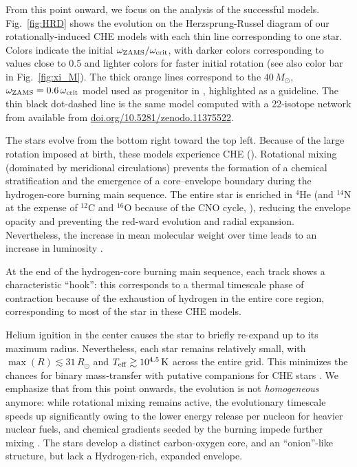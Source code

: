 \documentclass[%
trackchanges,twocolumn]{aastex701}
\DeclareRobustCommand{\Figref}[1]{Fig.~\ref{#1}}
\begin{document}
From this point onward, we focus on the analysis of the successful
models. \Figref{fig:HRD} shows the evolution on the Herzsprung-Russel
diagram of our rotationally-induced CHE models with each thin line
corresponding to one star. Colors indicate the initial
$\omega_{\rm ZAMS}/\omega_{\rm crit}$, with darker colors
corresponding to values close to 0.5 and lighter colors for faster
initial rotation (see also color bar in \Figref{fig:xi_M}). The thick
orange lines correspond to the $40\,M_{\odot}$,
$\omega_{\rm ZAMS}=0.6\,\omega_{\rm crit}$ model used as progenitor in
\cite{gottlieb:24}, highlighted as a guideline. The thin black
dot-dashed line is the same model computed with a 22-isotope network
from \cite{renzo:24} available from
\href{https://doi.org/10.5281/zenodo.11375522}{doi.org/10.5281/zenodo.11375522}.

The stars evolve from the bottom right toward the top left. Because of
the large rotation imposed at birth, these models experience CHE
(\citealt{maeder:00, yoon:06, demink:09}). Rotational mixing
(dominated by meridional circulations) prevents the formation of a
chemical stratification and the emergence of a core--envelope boundary
during the hydrogen-core burning main sequence. The entire star is
enriched in $^{4}\mathrm{He}$ (and $^{14}\mathrm{N}$ at the expense of
$^{12}\mathrm{C}$ and $^{16}\mathrm{O}$ because of the CNO cycle,
\citealt{bethe:39}), reducing the envelope opacity and preventing the
red-ward evolution and radial expansion. Nevertheless, the increase in
mean molecular weight over time leads to an increase in luminosity
\citep[e.g.,][]{kippenhahn:13, xin:2022}.

At the end of the hydrogen-core burning main sequence, each track
shows a characteristic ``hook'': this corresponds to a thermal
timescale phase of contraction because of the exhaustion of hydrogen
in the entire core region, corresponding to most of the star in these
CHE models.

Helium ignition in the center causes the star to briefly re-expand up
to its maximum radius. Nevertheless, each star remains relatively
small, with $\max(R)\lesssim 31\,R_{\odot}$ and
$T_{\rm eff}\gtrsim 10^{4.5}\,\mathrm{K}$ across the entire grid. This
minimizes the chances for binary mass-transfer with putative
companions for CHE stars \citep[e.g.,][]{demink:09,demink:16,mandel:16,marchant:16}. We emphasize that
from this point onwards, the evolution is not \emph{homogeneous}
anymore: while rotational mixing remains active, the evolutionary
timescale speeds up significantly owing to the lower energy release
per nucleon for heavier nuclear fuels, and chemical gradients seeded
by the burning impede further mixing \citep[e.g.,][]{heger:00,
  yoon:06, chieffi:13}. The stars develop a distinct carbon-oxygen
core, and an ``onion''-like structure, but lack a Hydrogen-rich,
expanded envelope.
\end{document}
